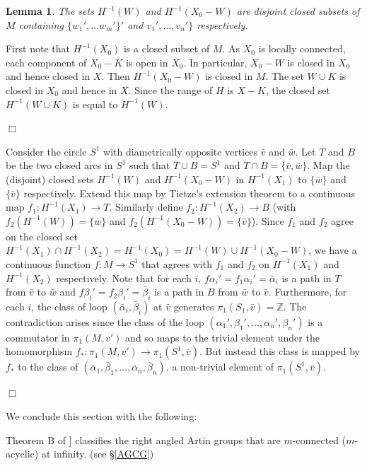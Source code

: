 \documentclass[12pt]{article}
\newtheorem{lemma}[theorem]{Lemma}
\newenvironment{proof}{\addvspace{12pt}\noindent{\bf Proof:}}{
$\Box$\par\addvspace{12pt}}
\begin{document}
\begin{proof}
	
	
	\begin{lemma} \label{VW} The sets $H^{-1}(W)$ and $H^{-1}(X_0-W)$ are disjoint closed subsets of $M$ containing $\{w_1',\ldots   w_m'\}'$ and $v_1',\ldots, v_n'\}$ respectively. 
	\end{lemma}
	\begin{proof}
		First note that $H^{-1}(X_0)$ is a closed subset of $M$.  As $X_0$ is locally connected, each component of $X_0-K$ is open in $X_0$. In particular, $X_0-W$ is closed in $X_0$ and hence closed in $X$. Then $H^{-1}(X_0-W)$ is closed in $M$. The set $W\cup K$ is closed in $X_0$ and hence in $X$. Since the range of $H$ is $X-K$, the closed set $H^{-1}(W\cup K)$ is equal to $H^{-1}(W)$.	
\end{proof} 
	
	Consider the circle $S^1$ with diametrically opposite vertices $\bar v$ and $\bar w$. Let $T$ and $B$ be the two closed arcs in $S^1$ such that $T\cup B=S^1$ and $T\cap B=\{\bar v,\bar w\}$. Map the (disjoint) closed sets $H^{-1}(W)$ and $H^{-1} (X_0-W)$ in $H^{-1}(X_1)$ to $\{\bar w\}$ and $\{\bar v\}$ respectively. Extend this map by Tietze's extension theorem to a continuous map $f_1:H^{-1}(X_1)\to T$. Similarly define $f_2:H^{-1}(X_2)\to B$ (with $f_2(H^{-1}(W))=\{\bar w\}$ and $f_2(H^{-1}(X_0-W))=\{\bar v\}$). Since $f_1$ and $f_2$ agree on the closed set $H^{-1}(X_1)\cap H^{-1} (X_2)=H^{-1}(X_0)= H^{-1}(W)\cup H^{-1} (X_0-W)$, we have a continuous function $f:M\to S^1$ that agrees with $f_1$ and $f_2$ on $H^{-1}(X_1)$ and $H^{-1}(X_2)$ respectively. Note that for each $i$, $f\alpha_i'=f_1\alpha_i'=\bar \alpha_i$ is a path in $T$ from $\bar v$ to $\bar w$ and $f\beta_i'=f_2\beta_i'=\bar \beta_i$ is a path in $B$ from $\bar w$ to $\bar v$. Furthermore, for each $i$, the class of loop $(\bar \alpha_i, \bar \beta_i)$ at $\bar v$ generates $\pi_1(S_1,\bar v)=\mathbb Z$. The contradiction arises since the class of the loop $(\alpha_1', \beta_1',\ldots, \alpha_n',\beta_n')$ is a commutator in $\pi_1(M, v')$ and so maps to the trivial element under the homomorphism $f_\ast:\pi_1(M,v')\to \pi_1(S^1,\bar v)$. But instead this class is mapped by $f_\ast$ to  the class of $(\bar \alpha_1,\bar \beta_1,\ldots, \bar \alpha_n, \bar \beta_n)$, a non-trivial element of $\pi_1(S^1,\bar v)$. 
\end{proof}

We conclude this section with the following:

Theorem B of \cite{BrM01}] classifies the right angled Artin groups that are $m$-connected ($m$-acyclic) at infinity. (see \S \ref{AGCG})
 
\end{document}
